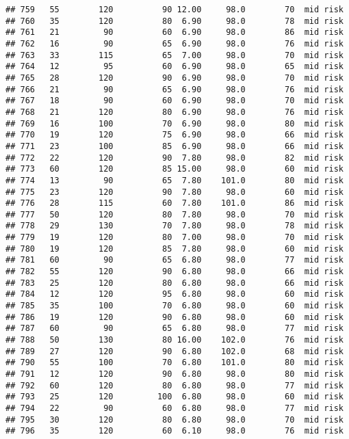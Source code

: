 \documentclass[
  ignorenonframetext,
]{beamer}
\begin{document}
\begin{frame}[fragile]
\begin{verbatim}
## 759   55        120          90 12.00     98.0        70  mid risk
## 760   35        120          80  6.90     98.0        78  mid risk
## 761   21         90          60  6.90     98.0        86  mid risk
## 762   16         90          65  6.90     98.0        76  mid risk
## 763   33        115          65  7.00     98.0        70  mid risk
## 764   12         95          60  6.90     98.0        65  mid risk
## 765   28        120          90  6.90     98.0        70  mid risk
## 766   21         90          65  6.90     98.0        76  mid risk
## 767   18         90          60  6.90     98.0        70  mid risk
## 768   21        120          80  6.90     98.0        76  mid risk
## 769   16        100          70  6.90     98.0        80  mid risk
## 770   19        120          75  6.90     98.0        66  mid risk
## 771   23        100          85  6.90     98.0        66  mid risk
## 772   22        120          90  7.80     98.0        82  mid risk
## 773   60        120          85 15.00     98.0        60  mid risk
## 774   13         90          65  7.80    101.0        80  mid risk
## 775   23        120          90  7.80     98.0        60  mid risk
## 776   28        115          60  7.80    101.0        86  mid risk
## 777   50        120          80  7.80     98.0        70  mid risk
## 778   29        130          70  7.80     98.0        78  mid risk
## 779   19        120          80  7.00     98.0        70  mid risk
## 780   19        120          85  7.80     98.0        60  mid risk
## 781   60         90          65  6.80     98.0        77  mid risk
## 782   55        120          90  6.80     98.0        66  mid risk
## 783   25        120          80  6.80     98.0        66  mid risk
## 784   12        120          95  6.80     98.0        60  mid risk
## 785   35        100          70  6.80     98.0        60  mid risk
## 786   19        120          90  6.80     98.0        60  mid risk
## 787   60         90          65  6.80     98.0        77  mid risk
## 788   50        130          80 16.00    102.0        76  mid risk
## 789   27        120          90  6.80    102.0        68  mid risk
## 790   55        100          70  6.80    101.0        80  mid risk
## 791   12        120          90  6.80     98.0        80  mid risk
## 792   60        120          80  6.80     98.0        77  mid risk
## 793   25        120         100  6.80     98.0        60  mid risk
## 794   22         90          60  6.80     98.0        77  mid risk
## 795   30        120          80  6.80     98.0        70  mid risk
## 796   35        120          60  6.10     98.0        76  mid risk

\end{verbatim}
\end{frame}
\end{document}
